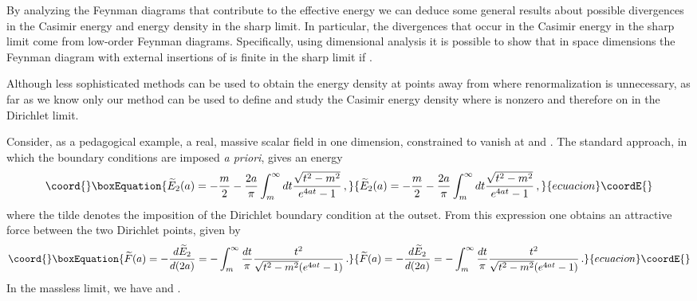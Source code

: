 \documentclass[a4paper,aps,amsfonts,prl,showpacs,nobibnotes,nofootinbib,%
tightenlines,twocolumn]{revtex4}
\providecommand{\vek}[1]{\mathbf{#1}}
\begin{document}
By analyzing the Feynman diagrams that contribute to the effective
energy we can deduce some general results about possible divergences
in the Casimir energy and energy density in the sharp limit.  In
particular, the divergences that occur in the Casimir energy in the
sharp limit come from low-order Feynman diagrams.  Specifically, using
dimensional analysis it is possible to show that in \coordHE{} space
dimensions the Feynman diagram with \coordHE{} external insertions of
\myHighlight{$\sigma$}\coordHE{} is finite in the sharp limit if \coordHE{}. 

Although less sophisticated methods can be used to obtain the energy
density at points away from \coordHE{} where renormalization is
unnecessary, as far as we know only our method can be used to define
and study the Casimir energy density where \myHighlight{$\sigma(\vek{x})$}\coordHE{} is nonzero
and therefore on \coordHE{} in the Dirichlet limit.   

Consider, as a pedagogical example, a real, massive scalar field
\coordHE{} in one dimension, constrained to vanish at \coordHE{} and \coordHE{}. 
The standard approach, in which the boundary conditions are imposed
{\it a priori\/}, gives an energy \cite{MT}
%
\begin{equation}\coord{}\boxEquation{
\widetilde{E}_{2}(a) = -\frac{m}{2} -
\frac{2a}{\pi}\int_{m}^{\infty}dt\frac{\sqrt{t^2-m^2}}{e^{4at}-1} \,,
\label{wrongenergy}
}{
\widetilde{E}_{2}(a) = -\frac{m}{2} -
\frac{2a}{\pi}\int_{m}^{\infty}dt\frac{\sqrt{t^2-m^2}}{e^{4at}-1} \,,
}{ecuacion}\coordE{}\end{equation}
%
where the tilde denotes the imposition of the Dirichlet boundary
condition at the outset.  From this expression one obtains an
attractive force between the two Dirichlet points, given by
%
\begin{equation}\coord{}\boxEquation{
\widetilde{F}(a)=-\frac{d\widetilde{E}_{2}}{d(2a)}
=-\int_{m}^{\infty}\frac{dt}{\pi}\frac{t^2}{\sqrt{t^2- m^2}(e^{4at}-1)}\, .
\label{force1}
}{
\widetilde{F}(a)=-\frac{d\widetilde{E}_{2}}{d(2a)}
=-\int_{m}^{\infty}\frac{dt}{\pi}\frac{t^2}{\sqrt{t^2- m^2}(e^{4at}-1)}\, .
}{ecuacion}\coordE{}\end{equation}
%
In the massless limit, we have \coordHE{} and
\coordHE{}.
\end{document}
